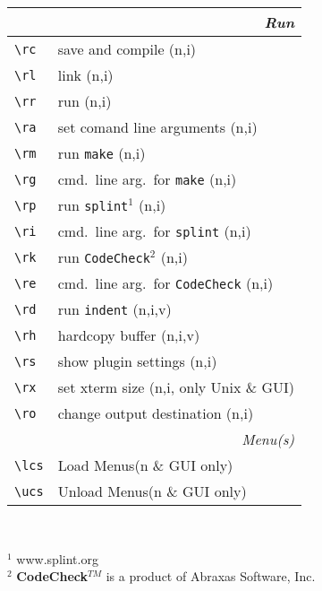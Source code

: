 \documentclass[oneside,10pt,landscape,DIV16]{scrartcl}
\begin{document}
\begin{multicols}{3}
\begin{center}
\begin{tabular}[]{|p{11mm}|p{58mm}|}
\hline 
\hline
\multicolumn{2}{|r|}{\textsl{\textbf{R}un}} \\
\hline \verb'\rc'  & save and compile                        \hfill (n,i)\\
\hline \verb'\rl'  & link                                    \hfill (n,i)\\
\hline \verb'\rr'  & run                                     \hfill (n,i)\\
\hline \verb'\ra'  & set comand line arguments               \hfill (n,i)\\
\hline \verb'\rm'  & run \texttt{make}                       \hfill (n,i)\\
\hline \verb'\rg'  & cmd.\ line arg.\ for \texttt{make}      \hfill (n,i)\\
%
\hline \verb'\rp'  & run \texttt{splint}$^1$     \hfill (n,i)\\
\hline \verb'\ri'  & cmd.\ line arg.\ for \texttt{splint}    \hfill (n,i)\\
%
\hline \verb'\rk'  & run \texttt{CodeCheck}$^2$  \hfill (n,i)\\
\hline \verb'\re'  & cmd.\ line arg.\ for \texttt{CodeCheck} \hfill (n,i)\\
%
\hline \verb'\rd'  & run \texttt{indent}         \hfill (n,i,v)\\
\hline \verb'\rh'  & hardcopy buffer             \hfill (n,i,v)\\
\hline \verb'\rs'  & show plugin settings        \hfill (n,i)\\
\hline \verb'\rx'  & set xterm size              \hfill (n,i, only Unix \& GUI)\\
\hline \verb'\ro'  & change output destination   \hfill (n,i)\\
\hline
%
\hline
\multicolumn{2}{|r|}{\textsl{Menu(s)}}\\
\hline \verb'\lcs'  & Load    Menus\hfill \scriptsize{(n \& GUI only)}\\
\hline \verb'\ucs'  & Unload  Menus\hfill \scriptsize{(n \& GUI only)}\\
\hline
\end{tabular} \\
\vspace{3mm}
\begin{minipage}[b]{69mm}
\footnotesize{%
$^1$ {www.splint.org}\\
$^2$ \textbf{CodeCheck}$^{TM}$ is a product of Abraxas Software, Inc.
}%
\end{minipage}%
%
\end{center}
\end{multicols}
\end{document}
